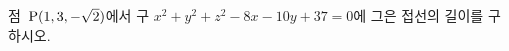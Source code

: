 점~$\mathrm{P}(1{,}\mkern3mu\mathopen{}3{,}\mkern3mu\mathopen{}-\sqrt{2})$에서 구 $x^2+y^2+z^2-8x-10y+37=0$에 그은 접선의 길이를 구하시오.
